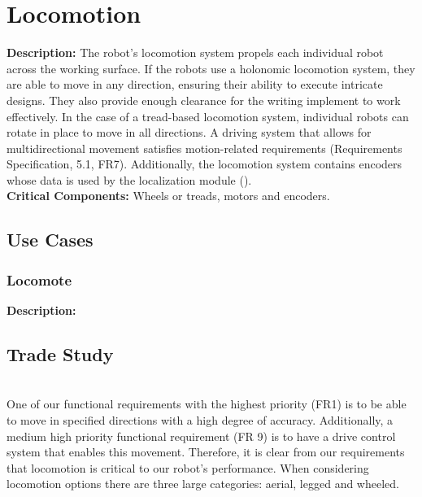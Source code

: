 
\section{Locomotion}
\label{sec:locomotion}
\textbf{Description:} The robot's locomotion system propels each individual robot across the working surface. If the robots use a holonomic locomotion system, they are able to move in any direction, ensuring their ability to execute intricate designs.  They also provide enough clearance for the writing implement to work effectively. In the case of a tread-based locomotion system, individual robots can rotate in place to move in all directions. A driving system that allows for multidirectional movement satisfies motion-related requirements (Requirements Specification, 5.1, FR7). Additionally, the locomotion system contains encoders whose data is used by the localization module (). \\

\noindent
\textbf{Critical Components:} Wheels or treads, motors and encoders.


\subsection{Use Cases}
\subsubsection{Locomote}
\textbf{Description:} 

\subsection{Trade Study}
\label{sec:trade_locomotion}
 \\
One of our functional requirements with the highest priority (FR1) is to be able to move in specified directions with a high degree of accuracy. Additionally, a medium high priority functional requirement (FR 9) is to have a drive control system that enables this movement. Therefore, it is clear from our requirements that locomotion is critical to our robot's performance. When considering locomotion options there are three large categories: aerial, legged and wheeled. 

